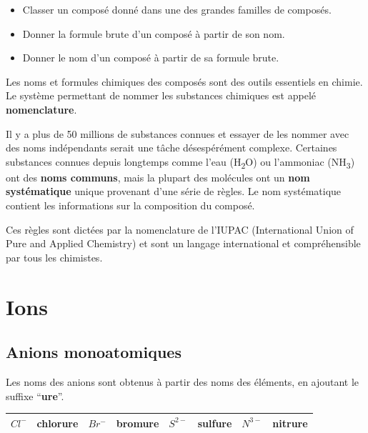 \documentclass[
  11pt,
  french,
  a4paper,
  openany]{book}
\providecommand{\tightlist}{%
  \setlength{\itemsep}{0pt}\setlength{\parskip}{0pt}}
\begin{document}
\begin{objectives}

\begin{itemize}
\tightlist
\item
  Classer un composé donné dans une des grandes familles de composés.
\item
  Donner la formule brute d'un composé à partir de son nom.
\item
  Donner le nom d'un composé à partir de sa formule brute.
\end{itemize}


\end{objectives}

Les noms et formules chimiques des composés sont des outils essentiels en chimie. Le système permettant de nommer les substances chimiques est appelé \textbf{nomenclature}.

Il y a plus de 50 millions de substances connues et essayer de les nommer avec des noms indépendants serait une tâche désespérément complexe. Certaines substances connues depuis longtemps comme l'eau (H\textsubscript{2}O) ou l'ammoniac (NH\textsubscript{3}) ont des \textbf{noms communs}, mais la plupart des molécules ont un \textbf{nom systématique} unique provenant d'une série de règles. Le nom systématique contient les informations sur la composition du composé.

Ces règles sont dictées par la nomenclature de l'IUPAC (International Union of Pure and Applied Chemistry) et sont un langage international et compréhensible par tous les chimistes.

\hypertarget{ions}{%
\section{Ions}\label{ions}}

\hypertarget{anions-monoatomiques}{%
\subsection{Anions monoatomiques}\label{anions-monoatomiques}}

Les noms des anions sont obtenus à partir des noms des éléments, en ajoutant le suffixe ``\textbf{ure}''.

\begin{longtable}[]{@{}clclclcc@{}}
\toprule
\endhead
\(Cl^-\) & chlor\textbf{ure} & \(Br^-\) & brom\textbf{ure} & \(S^{2-}\) & sulf\textbf{ure} & \(N^{3-}\) & nitr\textbf{ure}\tabularnewline
\bottomrule
\end{longtable}
\end{document}
